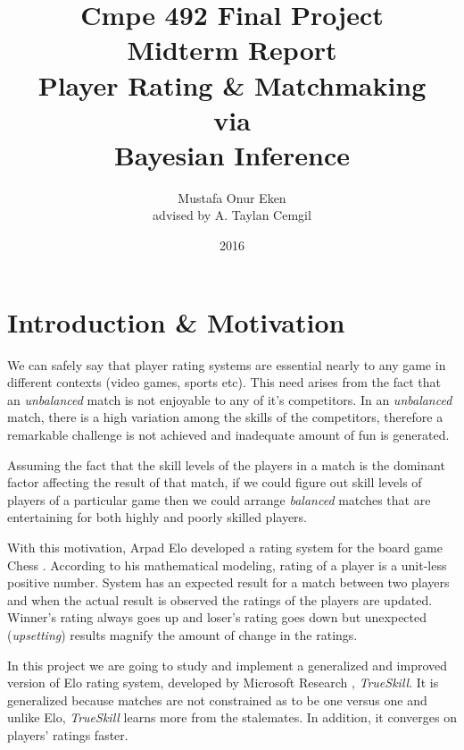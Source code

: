 \documentclass[12pt]{article}
\title{Cmpe 492  Final Project \\[1mm] Midterm Report \\[60mm] Player Rating \& Matchmaking\\ via \\[3mm] Bayesian Inference}
\author{Mustafa Onur Eken\\ advised by A. Taylan Cemgil}
\date{2016}
\begin{document}
\maketitle
\thispagestyle{empty}
\newpage

\pagebreak
\tableofcontents

\pagebreak





%
%
\section{Introduction \& Motivation}

We can safely say that player rating systems are essential nearly to any game in different contexts (video games, sports etc). This need arises from the fact that an \textit{unbalanced} match is not enjoyable to any of it's competitors. In an \textit{unbalanced}  match, there is a high variation among the skills of the competitors, therefore a remarkable challenge is not achieved and inadequate amount of fun is generated.

Assuming the fact that the skill levels of the players in a match is the dominant factor affecting the result of that match, if we could figure out skill levels of players of a particular game then we could arrange \textit{balanced} matches that are entertaining for both highly and poorly skilled players. 

With this motivation, Arpad Elo developed a rating system for the board game Chess \cite{wiki:elo}. According to his mathematical modeling, rating of a player is a unit-less positive number. System has an expected result for a match between two players and when the actual result is observed the ratings of the players are updated. Winner's rating always goes up and loser's rating goes down but unexpected (\textit{upsetting}) results magnify the amount of change in the ratings.

In this project we are going to study and implement a generalized and improved version of Elo rating system, developed by Microsoft Research , \textit{TrueSkill}. It is generalized because matches are not constrained as to be one versus one and unlike Elo, \textit{TrueSkill }learns more from the stalemates. In addition, it converges on players' ratings faster.
\end{document}

